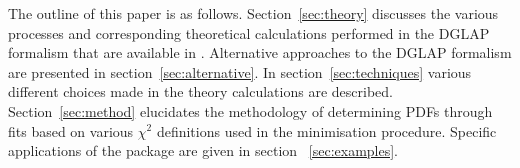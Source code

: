 The outline of this paper is as follows.
%
Section~\ref{sec:theory} discusses the various processes 
and corresponding theoretical calculations performed in the DGLAP~\cite{Gribov:1972ri,Gribov:1972rt,Lipatov:1974qm,
Dokshitzer:1977sg,Altarelli:1977zs} formalism that are available in \fitter.
Alternative approaches to the DGLAP formalism are presented in section~\ref{sec:alternative}.
%
In section~\ref{sec:techniques} various different choices made in the 
theory calculations are described.
Section~\ref{sec:method} elucidates the 
methodology of determining PDFs through fits based on various
 $\chi^2$ definitions used in the
minimisation procedure. 
%
Specific applications of the package are given in
section ~\ref{sec:examples}. 
%
